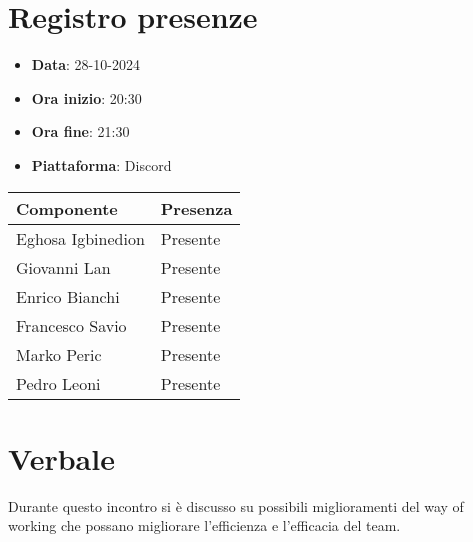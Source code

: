 \documentclass[a4paper, 12pt]{article}
\begin{document}
\section{Registro presenze}
\begin{itemize}
    \item[] \textbf{Data}: 28-10-2024
    \item[] \textbf{Ora inizio}:  20:30
    \item[] \textbf{Ora fine}: 21:30
    \item[] \textbf{Piattaforma}: Discord
\end{itemize}
\begin{table}[!h]
\centering
{\renewcommand{\arraystretch}{2}
\begin{tabularx}{\textwidth}{| X | X |}
    \hline
        \textbf{\large Componente} & 
        \textbf{\large Presenza} \\ 
    \hline 
    \hline
        Eghosa Igbinedion&
        Presente \\
    \hline 
        Giovanni Lan&
        Presente \\
    \hline 
        Enrico Bianchi&
        Presente \\
    \hline 
        Francesco Savio&
        Presente \\
    \hline 
        Marko Peric&
        Presente \\
    \hline 
        Pedro Leoni&
        Presente \\
    \hline 

\end{tabularx}}
\end{table}

\newpage

\section{Verbale}
Durante questo incontro si è discusso su possibili miglioramenti del way of working che possano migliorare l’efficienza e l’efficacia del team.
\end{document}
